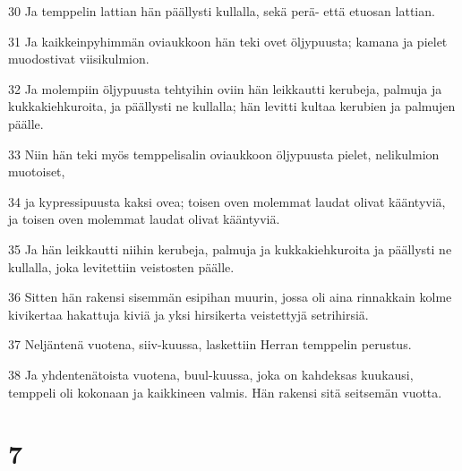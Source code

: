 \par 30 Ja temppelin lattian hän päällysti kullalla, sekä perä- että etuosan lattian.
\par 31 Ja kaikkeinpyhimmän oviaukkoon hän teki ovet öljypuusta; kamana ja pielet muodostivat viisikulmion.
\par 32 Ja molempiin öljypuusta tehtyihin oviin hän leikkautti kerubeja, palmuja ja kukkakiehkuroita, ja päällysti ne kullalla; hän levitti kultaa kerubien ja palmujen päälle.
\par 33 Niin hän teki myös temppelisalin oviaukkoon öljypuusta pielet, nelikulmion muotoiset,
\par 34 ja kypressipuusta kaksi ovea; toisen oven molemmat laudat olivat kääntyviä, ja toisen oven molemmat laudat olivat kääntyviä.
\par 35 Ja hän leikkautti niihin kerubeja, palmuja ja kukkakiehkuroita ja päällysti ne kullalla, joka levitettiin veistosten päälle.
\par 36 Sitten hän rakensi sisemmän esipihan muurin, jossa oli aina rinnakkain kolme kivikertaa hakattuja kiviä ja yksi hirsikerta veistettyjä setrihirsiä.
\par 37 Neljäntenä vuotena, siiv-kuussa, laskettiin Herran temppelin perustus.
\par 38 Ja yhdentenätoista vuotena, buul-kuussa, joka on kahdeksas kuukausi, temppeli oli kokonaan ja kaikkineen valmis. Hän rakensi sitä seitsemän vuotta.

\chapter{7}

